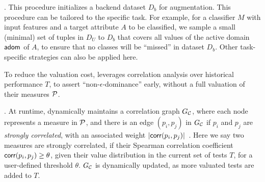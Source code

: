 
. This procedure 
initializes a backend dataset $D_b$  for augmentation. 
This procedure can be tailored to the specific task. 
For example, 
for a classifier $M$ with input features  
and a target attribute $A$ to be classified, 
we sample a small (minimal) set of tuples in $D_U$ to 
$D_b$ that covers all 
values of the active domain $\ad$ of $A$, to ensure that 
no classes will be ``missed'' in dataset $D_b$. 
Other task-specific strategies can also be applied here. 

\vspace{.5ex}
To reduce the valuation cost, \bimodis leverages correlation analysis 
over historical performance $T$, to 
assert ``non-$\epsilon$-dominance'' early, without a full valuation of their measures $\P$.  

. At runtime, 
\bimodis dynamically maintains 
a correlation graph $G_\C$, where 
each node represents a measure in $\P$, and there is an edge $(p_i, p_j)$ in $G_\C$ if $p_i$ and $p_j$ are {\em strongly correlated}, with an associated weight $|\kw{corr}(p_i, p_j)|$~\cite{zheng2019towards}. Here 
we say two measures are strongly correlated, 
if their Spearman correlation coefficient $\kw{corr}(p_i, p_j)\geq \theta$, given their 
value distribution in the current 
set of tests $T$, for a user-defined threshold $\theta$. 
$G_\C$ is dynamically updated, 
as more valuated tests are added to $T$.

